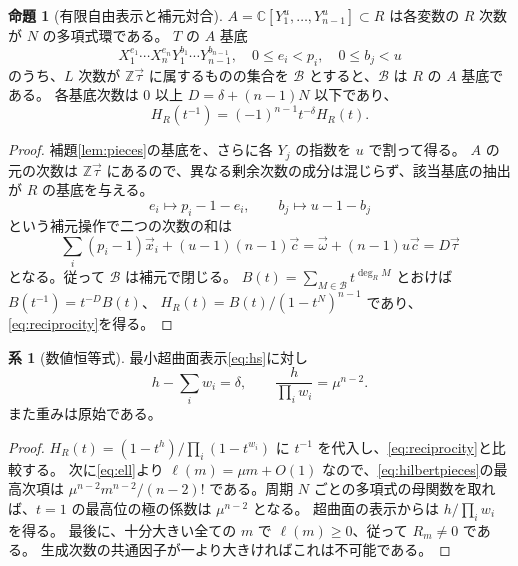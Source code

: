 \documentclass[11pt,a4paper]{ltjsarticle}
\numberwithin{equation}{section}
\theoremstyle{definition}
\newtheorem{proposition}[theorem]{命題}
\newtheorem{corollary}[theorem]{系}
\newcommand{\Z}{\mathbb Z}\newcommand{\N}{\mathbb N}\newcommand{\Q}{\mathbb Q}\newcommand{\C}{\mathbb C}
\newcommand{\cc}{\vec c}\newcommand{\xx}{\vec x}\newcommand{\om}{\vec\omega}\newcommand{\ta}{\vec\tau}
\begin{document}
\begin{proposition}[有限自由表示と補元対合]\label{prop:free}
$A=\C[Y_1^u,\dots,Y_{n-1}^u]\subset R$ は各変数の $R$ 次数が $N$ の多項式環である。
$T$ の $A$ 基底
\[
 X_1^{e_1}\cdots X_n^{e_n}Y_1^{b_1}\cdots Y_{n-1}^{b_{n-1}},
 \quad0\le e_i<p_i,\quad0\le b_j<u
\]
のうち、$L$ 次数が $\Z\ta$ に属するものの集合を $\mathcal B$ とすると、$\mathcal B$ は $R$ の $A$ 基底である。
各基底次数は $0$ 以上 $D=\delta+(n-1)N$ 以下であり、
\begin{equation}\label{eq:reciprocity}
 H_R(t^{-1})=(-1)^{n-1}t^{-\delta}H_R(t).
\end{equation}
\end{proposition}
\begin{proof}
補題\ref{lem:pieces}の基底を、さらに各 $Y_j$ の指数を $u$ で割って得る。
$A$ の元の次数は $\Z\ta$ にあるので、異なる剰余次数の成分は混じらず、該当基底の抽出が $R$ の基底を与える。
\[
 e_i\longmapsto p_i-1-e_i,\qquad b_j\longmapsto u-1-b_j
\]
という補元操作で二つの次数の和は
\[
 \sum_i(p_i-1)\xx_i+(u-1)(n-1)\cc
 =\om+(n-1)u\cc=D\ta
\]
となる。従って $\mathcal B$ は補元で閉じる。
$B(t)=\sum_{M\in\mathcal B}t^{\deg_R M}$ とおけば $B(t^{-1})=t^{-D}B(t)$、
$H_R(t)=B(t)/(1-t^N)^{n-1}$ であり、\eqref{eq:reciprocity}を得る。
\end{proof}

\begin{corollary}[数値恒等式]\label{cor:numerical}
最小超曲面表示\eqref{eq:hs}に対し
\begin{equation}\label{eq:numerical}
 h-\sum_iw_i=\delta,\qquad
 \frac{h}{\prod_iw_i}=\mu^{n-2}.
\end{equation}
また重みは原始である。
\end{corollary}
\begin{proof}
$H_R(t)=(1-t^h)/\prod_i(1-t^{w_i})$ に $t^{-1}$ を代入し、\eqref{eq:reciprocity}と比較する。
次に\eqref{eq:ell}より $\ell(m)=\mu m+O(1)$ なので、\eqref{eq:hilbertpieces}の最高次項は
$\mu^{n-2}m^{n-2}/(n-2)!$ である。周期 $N$ ごとの多項式の母関数を取れば、$t=1$ の最高位の極の係数は $\mu^{n-2}$ となる。
超曲面の表示からは $h/\prod_iw_i$ を得る。
最後に、十分大きい全ての $m$ で $\ell(m)\ge0$、従って $R_m\ne0$ である。
生成次数の共通因子が一より大きければこれは不可能である。
\end{proof}
\end{document}
